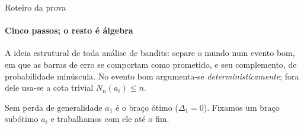 \documentclass[aspectratio=169, 11pt]{beamer}
\begin{document}
\begin{frame}{Roteiro da prova}
  \framesubtitle{Cinco passos; o resto é álgebra}

  \begin{center}
  \end{center}

  \begin{ideiabox}
    A ideia estrutural de toda análise de bandits: separe o mundo num
    \alert{evento bom}, em que as barras de erro se comportam como prometido,
    e seu complemento, de probabilidade minúscula. No evento bom argumenta-se
    \emph{deterministicamente}; fora dele usa-se a cota trivial
    $N_n(a_i)\le n$.
  \end{ideiabox}

  {\small Sem perda de generalidade $a_1$ é o braço ótimo ($\Delta_1=0$).
  Fixamos um braço subótimo $a_i$ e trabalhamos com ele até o fim.}
\end{frame}
\end{document}
